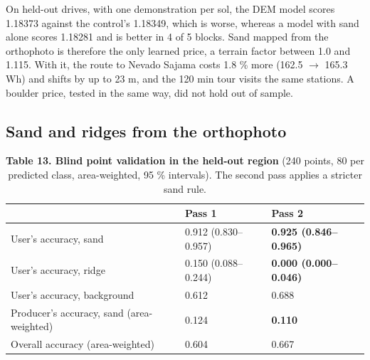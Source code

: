 \documentclass[11pt,a4paper]{article}
\begin{document}
\begin{table}[H]
\centering\small
\caption{\textbf{Table 12. Inverse reinforcement learning on Curiosity's route: negative log-likelihood per metre of the terrain model and of the distance-only control.}}
\end{table}

On held-out drives, with one demonstration per sol, the DEM model scores 1.18373 against the control's 1.18349, which is worse, whereas a model with sand alone scores 1.18281 and is better in 4 of 5 blocks. Sand mapped from the orthophoto is therefore the only learned price, a terrain factor between 1.0 and 1.115. With it, the route to Nevado Sajama costs 1.8 \% more (162.5 $\rightarrow$ 165.3 Wh) and shifts by up to 23 m, and the 120 min tour visits the same stations. A boulder price, tested in the same way, did not hold out of sample.

\subsection{Sand and ridges from the orthophoto}

\begin{table}[H]
\centering\small
\caption{\textbf{Table 13. Blind point validation in the held-out region} (240 points, 80 per predicted class, area-weighted, 95 \% intervals). The second pass applies a stricter sand rule.}
\begin{tabular}{lll}
\toprule
 & Pass 1 & Pass 2 \\
\midrule
User's accuracy, sand & 0.912 (0.830--0.957) & \textbf{0.925 (0.846--0.965)} \\
User's accuracy, ridge & 0.150 (0.088--0.244) & \textbf{0.000 (0.000--0.046)} \\
User's accuracy, background & 0.612 & 0.688 \\
Producer's accuracy, sand (area-weighted) & 0.124 & \textbf{0.110} \\
Overall accuracy (area-weighted) & 0.604 & 0.667 \\
\bottomrule
\end{tabular}
\end{table}
\end{document}
